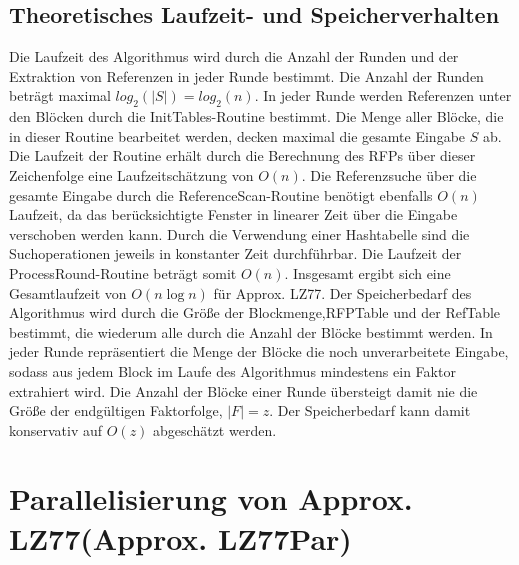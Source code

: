 \subsection{Theoretisches Laufzeit- und Speicherverhalten}
Die Laufzeit des Algorithmus wird durch die Anzahl der Runden und der Extraktion von Referenzen in jeder Runde bestimmt. Die Anzahl der Runden beträgt maximal $log_2(|S|)=log_2(n)$. In jeder Runde
werden Referenzen unter den Blöcken durch die InitTables-Routine bestimmt. Die Menge aller Blöcke, die in dieser Routine bearbeitet werden, decken maximal die gesamte Eingabe $S$ ab. Die Laufzeit
der Routine erhält durch die Berechnung des RFPs über dieser Zeichenfolge eine Laufzeitschätzung von $O(n)$. Die Referenzsuche über die gesamte Eingabe durch die ReferenceScan-Routine benötigt ebenfalls
$O(n)$ Laufzeit, da das berücksichtigte Fenster in linearer Zeit über die Eingabe verschoben werden kann. Durch die Verwendung einer Hashtabelle sind die Suchoperationen jeweils in konstanter Zeit
durchführbar. Die Laufzeit der ProcessRound-Routine beträgt somit $O(n)$. Insgesamt ergibt sich eine Gesamtlaufzeit von $O(n\log{n})$ für Approx. LZ77. 
Der Speicherbedarf des Algorithmus wird durch die Größe der Blockmenge,RFPTable und der RefTable bestimmt, die wiederum alle durch die Anzahl der Blöcke bestimmt werden. In jeder Runde repräsentiert 
die Menge der Blöcke die noch unverarbeitete Eingabe, sodass aus jedem Block im Laufe des Algorithmus mindestens ein Faktor extrahiert wird. Die Anzahl der Blöcke einer Runde übersteigt damit nie die 
Größe der endgültigen Faktorfolge, $|F|=z$. Der Speicherbedarf kann damit konservativ auf $O(z)$ abgeschätzt werden.

\section{Parallelisierung von Approx. LZ77(Approx. LZ77Par)}
